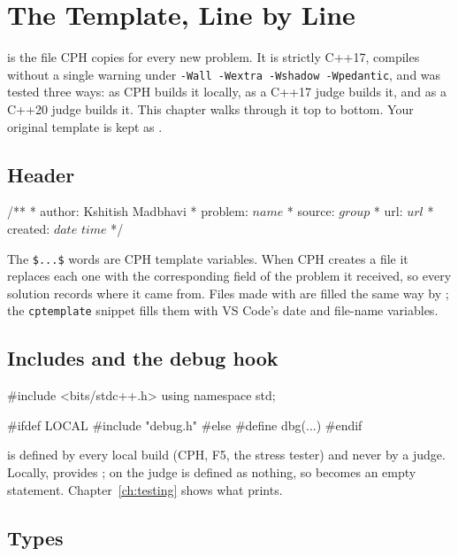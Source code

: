 \chapter{The Template, Line by Line}\label{ch:template}

 is the file CPH copies for every new problem. It is strictly C++17, compiles without a
single warning under \texttt{-Wall -Wextra -Wshadow -Wpedantic}, and was tested three ways: as CPH builds it locally,
as a C++17 judge builds it, and as a C++20 judge builds it. This chapter walks through it top to bottom.
Your original template is kept as .

\section{Header}

\begin{code}
/**
 *    author:  Kshitish Madbhavi
 *    problem: $name$
 *    source:  $group$
 *    url:     $url$
 *    created: $date$ $time$
 */
\end{code}

The \texttt{\$...\$} words are CPH template variables. When CPH creates a file it replaces each one with the
corresponding field of the problem it received, so every solution records where it came from. Files made with
 are filled the same way by ; the \texttt{cptemplate} snippet fills them with
VS Code's date and file-name variables.

\section{Includes and the debug hook}

\begin{code}
#include <bits/stdc++.h>
using namespace std;

#ifdef LOCAL
#include "debug.h"
#else
#define dbg(...)
#endif
\end{code}

 is defined by every local build (CPH, F5, the stress tester) and never by a judge. Locally,
 provides ; on the judge  is defined as nothing, so
 becomes an empty statement. Chapter~\ref{ch:testing} shows what  prints.

\section{Types}

